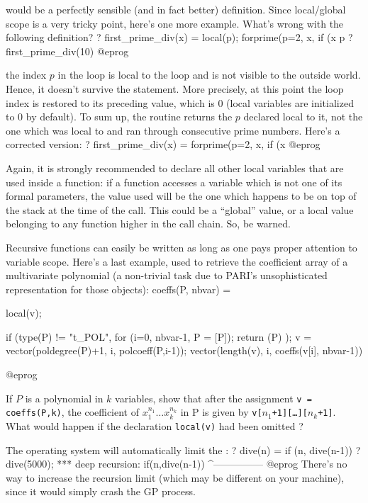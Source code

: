 \noindent would be a perfectly sensible (and in fact better) definition.
Since local/global scope is a very tricky point, here's one more example.
What's wrong with the following definition?
\bprog
? first_prime_div(x) = 
{
  local(p);
  forprime(p=2, x, if (x%
  p
}
? first_prime_div(10)
@eprog

 the index $p$ in the  loop is local to
the loop and is not visible to the outside world. Hence, it doesn't survive
the  statement. More precisely, at this point the loop index is
restored to its preceding value, which is 0 (local variables are
initialized to 0 by default). To sum up, the routine returns the $p$
declared local to it, not the one which was local to  and ran
through consecutive prime numbers. Here's a corrected version:
\bprog
? first_prime_div(x) = forprime(p=2, x, if (x%
@eprog

Again, it is strongly recommended to declare all other local variables that
are used inside a function: if a function accesses a variable which is not
one of its formal parameters, the value used will be the one which happens to
be on top of the stack at the time of the call. This could be a ``global''
value, or a local value belonging to any function higher in the call chain.
So, be warned.

Recursive functions can easily be written as long as one
pays proper attention to variable scope. Here's a last example, used to
retrieve the coefficient array of a multivariate polynomial (a non-trivial
task due to PARI's unsophisticated representation for those objects):
\bprog
coeffs(P, nbvar) =
{
  local(v);

  if (type(P) != "t_POL",
    for (i=0, nbvar-1, P = [P]);
    return (P)
  );
  v = vector(poldegree(P)+1, i, polcoeff(P,i-1));
  vector(length(v), i, coeffs(v[i], nbvar-1))
}
@eprog

\noindent If $P$ is a polynomial in $k$ variables, show that after the
assignment {\tt v = coeffs(P,k)}, the coefficient of $x_1^{n_1}\dots
x_k^{n_k}$ in P is given by {\tt v[$n_1$+1][\dots][$n_k$+1]}. What would
happen if the declaration {\tt local(v)} had been omitted ?

The operating system will automatically limit the :
\bprog
? dive(n) = if (n, dive(n-1))
? dive(5000);
  ***   deep recursion: if(n,dive(n-1))
                        ^---------------
@eprog
There's no way to increase the recursion limit (which may be different on
your machine), since it would simply crash the GP process.

